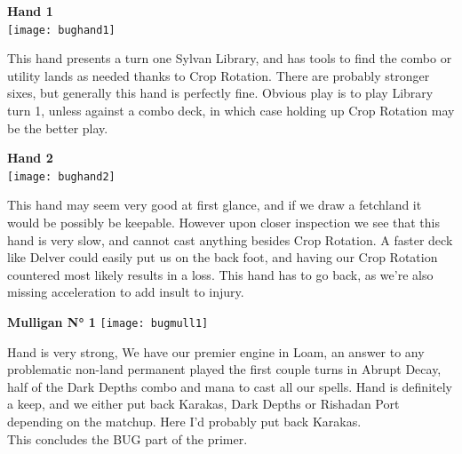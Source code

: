 \documentclass{report}
\begin{document}
\begin{center}
\textbf{Hand 1\\}
\texttt{[image: bughand1]}
\end{center}
This hand presents a turn one Sylvan Library, and has tools to find the combo or utility lands as needed thanks to Crop Rotation. There are probably stronger sixes, but generally this hand is perfectly fine. Obvious play is to play Library turn 1, unless against a combo deck, in which case holding up Crop Rotation may be the better play.\\
\begin{center}
\textbf{Hand 2\\}
\texttt{[image: bughand2]}
\end{center}
This hand may seem very good at first glance, and if we draw a fetchland it would be possibly be keepable. However upon closer inspection we see that this hand is very slow, and cannot cast anything besides Crop Rotation. A faster deck like Delver could easily put us on the back foot, and having our Crop Rotation countered most likely results in a loss. This hand has to go back, as we're also missing acceleration to add insult to injury.
\newpage
\begin{center}
\textbf{Mulligan N° 1}
\texttt{[image: bugmull1]}
\end{center}
Hand is very strong, We have our premier engine in Loam, an answer to any problematic non-land permanent played the first couple turns in Abrupt Decay, half of the Dark Depths combo and mana to cast all our spells. Hand is definitely a keep, and we either put back Karakas, Dark Depths or Rishadan Port depending on the matchup. Here I'd probably put back Karakas.\\
This concludes the BUG part of the primer.\\
\end{document}
